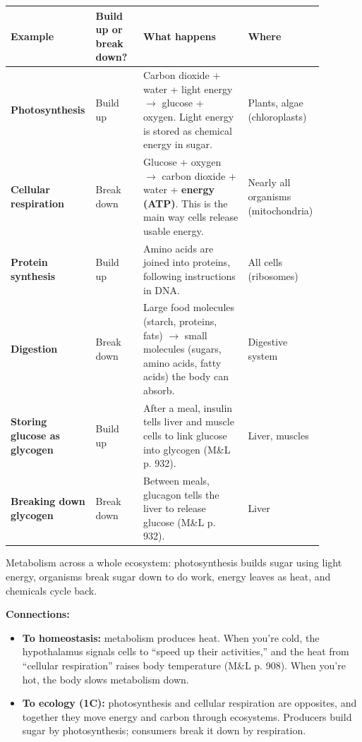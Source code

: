 \documentclass[11pt,letterpaper]{article}
\begin{document}
\begin{longtable}{@{}>{\raggedright\arraybackslash}p{0.19\linewidth}>{\raggedright\arraybackslash}p{0.15\linewidth}>{\raggedright\arraybackslash}p{0.33\linewidth}>{\raggedright\arraybackslash}p{0.21\linewidth}@{}}
\toprule
Example & Build up or break down? & What happens & Where \\
\midrule
\endhead
\textbf{Photosynthesis} & Build up & Carbon dioxide + water + light energy $\rightarrow$ glucose + oxygen. Light energy is stored as chemical energy in sugar. & Plants, algae (chloroplasts) \\
\textbf{Cellular respiration} & Break down & Glucose + oxygen $\rightarrow$ carbon dioxide + water + \textbf{energy (ATP)}. This is the main way cells release usable energy. & Nearly all organisms (mitochondria) \\
\textbf{Protein synthesis} & Build up & Amino acids are joined into proteins, following instructions in DNA. & All cells (ribosomes) \\
\textbf{Digestion} & Break down & Large food molecules (starch, proteins, fats) $\rightarrow$ small molecules (sugars, amino acids, fatty acids) the body can absorb. & Digestive system \\
\textbf{Storing glucose as glycogen} & Build up & After a meal, insulin tells liver and muscle cells to link glucose into glycogen (M\&L p. 932). & Liver, muscles \\
\textbf{Breaking down glycogen} & Break down & Between meals, glucagon tells the liver to release glucose (M\&L p. 932). & Liver \\
\bottomrule
\end{longtable}

  {Metabolism across a whole ecosystem: photosynthesis builds sugar using light energy, organisms break sugar down to do work, energy leaves as heat, and chemicals cycle back.}

\textbf{Connections:}
\begin{itemize}
  \item \textbf{To homeostasis:} metabolism produces heat. When you're cold, the hypothalamus signals cells to ``speed up their activities,'' and the heat from ``cellular respiration'' raises body temperature (M\&L p. 908). When you're hot, the body slows metabolism down.
  \item \textbf{To ecology (1C):} photosynthesis and cellular respiration are opposites, and together they move energy and carbon through ecosystems. Producers build sugar by photosynthesis; consumers break it down by respiration.
\end{itemize}
\end{document}
